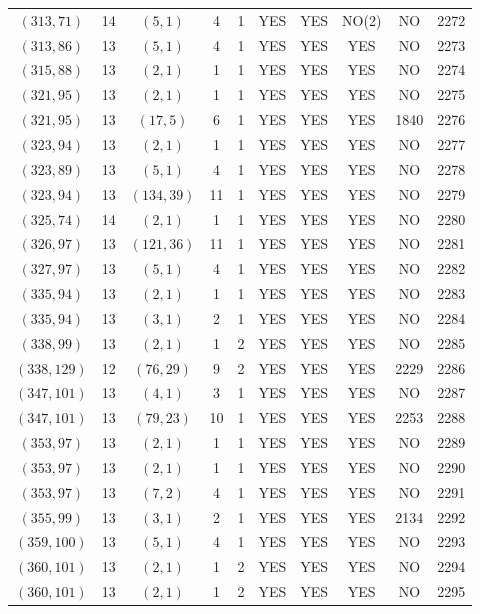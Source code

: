 \begin{longtable}{|c|c|c|c|c|c|c|c|c|c|}
$(313, 71)$ & 14 & $(5, 1)$ & 4 & 1 & YES & YES & NO(2) & NO & 2272\\
$(313, 86)$ & 13 & $(5, 1)$ & 4 & 1 & YES & YES & YES & NO & 2273\\
$(315, 88)$ & 13 & $(2, 1)$ & 1 & 1 & YES & YES & YES & NO & 2274\\
$(321, 95)$ & 13 & $(2, 1)$ & 1 & 1 & YES & YES & YES & NO & 2275\\
$(321, 95)$ & 13 & $(17, 5)$ & 6 & 1 & YES & YES & YES & 1840 & 2276\\
$(323, 94)$ & 13 & $(2, 1)$ & 1 & 1 & YES & YES & YES & NO & 2277\\
$(323, 89)$ & 13 & $(5, 1)$ & 4 & 1 & YES & YES & YES & NO & 2278\\
$(323, 94)$ & 13 & $(134, 39)$ & 11 & 1 & YES & YES & YES & NO & 2279\\
$(325, 74)$ & 14 & $(2, 1)$ & 1 & 1 & YES & YES & YES & NO & 2280\\
$(326, 97)$ & 13 & $(121, 36)$ & 11 & 1 & YES & YES & YES & NO & 2281\\
$(327, 97)$ & 13 & $(5, 1)$ & 4 & 1 & YES & YES & YES & NO & 2282\\
$(335, 94)$ & 13 & $(2, 1)$ & 1 & 1 & YES & YES & YES & NO & 2283\\
$(335, 94)$ & 13 & $(3, 1)$ & 2 & 1 & YES & YES & YES & NO & 2284\\
$(338, 99)$ & 13 & $(2, 1)$ & 1 & 2 & YES & YES & YES & NO & 2285\\
$(338, 129)$ & 12 & $(76, 29)$ & 9 & 2 & YES & YES & YES & 2229 & 2286\\
$(347, 101)$ & 13 & $(4, 1)$ & 3 & 1 & YES & YES & YES & NO & 2287\\
$(347, 101)$ & 13 & $(79, 23)$ & 10 & 1 & YES & YES & YES & 2253 & 2288\\
$(353, 97)$ & 13 & $(2, 1)$ & 1 & 1 & YES & YES & YES & NO & 2289\\
$(353, 97)$ & 13 & $(2, 1)$ & 1 & 1 & YES & YES & YES & NO & 2290\\
$(353, 97)$ & 13 & $(7, 2)$ & 4 & 1 & YES & YES & YES & NO & 2291\\
$(355, 99)$ & 13 & $(3, 1)$ & 2 & 1 & YES & YES & YES & 2134 & 2292\\
$(359, 100)$ & 13 & $(5, 1)$ & 4 & 1 & YES & YES & YES & NO & 2293\\
$(360, 101)$ & 13 & $(2, 1)$ & 1 & 2 & YES & YES & YES & NO & 2294\\
$(360, 101)$ & 13 & $(2, 1)$ & 1 & 2 & YES & YES & YES & NO & 2295\\

\end{longtable}
